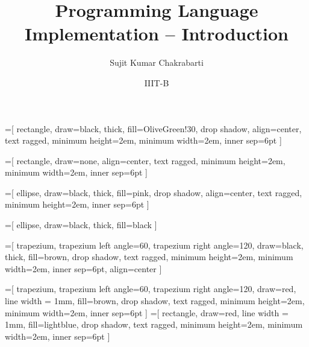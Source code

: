 \documentclass{beamer}
\title[Sujit]{Programming Language Implementation -- Introduction}
\author{Sujit Kumar Chakrabarti}
\institute{IIITB}
\date{IIIT-B}
\begin{document}

\maketitle

\newcommand{\highlight}[1]{{\color{Red}(#1)}}

\newcommand{\myheader}[1]{
	{\color{darkblue}
		\begin{Large}
			\begin{center}
				{#1}
			\end{center}
		\end{Large}
	}
}
\newcommand{\myminorheader}[1]{
	{\color{BrickRed}
		\begin{Large}
			{\fontfamily{\sfdefault}\selectfont\textbf{#1}}
		\end{Large}
	}
}



=[%
      rectangle, draw=black, thick, fill=OliveGreen!30, drop shadow, align=center,
      text ragged, minimum height=2em, minimum width=2em, inner sep=6pt
]

=[%
      rectangle, draw=none,  align=center,
      text ragged, minimum height=2em, minimum width=2em, inner sep=6pt
]

=[%
      ellipse, draw=black, thick, fill=pink, drop shadow, align=center,
      text ragged, minimum height=2em, inner sep=6pt
]

=[%
      ellipse, draw=black, thick, fill=black
]

=[%
      trapezium, trapezium left angle=60, trapezium right angle=120, draw=black, thick, fill=brown, drop shadow,
      text ragged, minimum height=2em, minimum width=2em, inner sep=6pt, align=center
]

=[%
      trapezium, trapezium left angle=60, trapezium right angle=120, draw=red, line width = 1mm, fill=brown, drop shadow,
      text ragged, minimum height=2em, minimum width=2em, inner sep=6pt
]
=[%
      rectangle, draw=red, line width = 1mm, fill=lightblue, drop shadow,
      text ragged, minimum height=2em, minimum width=2em, inner sep=6pt
]
\end{document}
